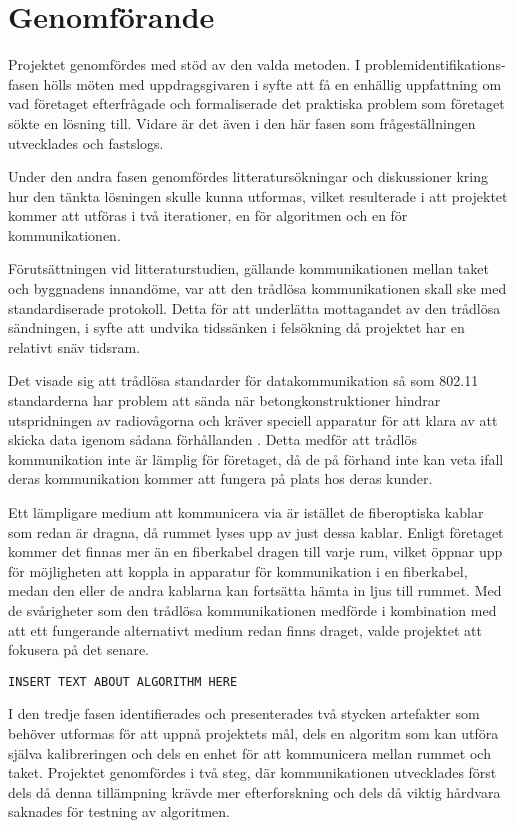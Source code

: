 \section{Genomförande} %
\label{sec:genomf_rande}

    Projektet genomfördes med stöd av den valda metoden. I problemidentifikations-fasen hölls möten med uppdragsgivaren i syfte att få en enhällig uppfattning om vad företaget efterfrågade och formaliserade det praktiska problem som företaget sökte en lösning till. Vidare är det även i den här fasen som frågeställningen utvecklades och fastslogs. \bigskip

    Under den andra fasen genomfördes litteratursökningar och diskussioner kring hur den tänkta lösningen skulle kunna utformas, vilket resulterade i att projektet kommer att utföras i två iterationer, en för algoritmen och en för kommunikationen. \bigskip

    Förutsättningen vid litteraturstudien, gällande kommunikationen mellan taket och byggnadens innandöme, var att den trådlösa kommunikationen skall ske med standardiserade protokoll. Detta för att underlätta mottagandet av den trådlösa sändningen, i syfte att undvika tidssänken i felsökning då projektet har en relativt snäv tidsram.\bigskip

    Det visade sig att trådlösa standarder för datakommunikation så som 802.11 standarderna har problem att sända när betongkonstruktioner hindrar utspridningen av radiovågorna och kräver speciell apparatur för att klara av att skicka data igenom sådana förhållanden \cite{11n}. Detta medför att trådlös kommunikation inte är lämplig för företaget, då de på förhand inte kan veta ifall deras kommunikation kommer att fungera på plats hos deras kunder. \bigskip

    Ett lämpligare medium att kommunicera via är istället de fiberoptiska kablar som redan är dragna, då rummet lyses upp av just dessa kablar. Enligt företaget kommer det finnas mer än en fiberkabel dragen till varje rum, vilket öppnar upp för möjligheten att koppla in apparatur för kommunikation i en fiberkabel, medan den eller de andra kablarna kan fortsätta hämta in ljus till rummet. Med de svårigheter som den trådlösa kommunikationen medförde i kombination med att ett fungerande alternativt medium redan finns draget, valde projektet att fokusera på det senare. \bigskip

    \texttt{INSERT TEXT ABOUT ALGORITHM HERE} \bigskip
 
    I den tredje fasen identifierades och presenterades två stycken artefakter som behöver utformas för att uppnå projektets mål, dels en algoritm som kan utföra själva kalibreringen och dels en enhet för att kommunicera mellan rummet och taket. Projektet genomfördes i två steg, där kommunikationen 
    utvecklades först dels då denna tillämpning krävde mer efterforskning och dels då viktig hårdvara saknades för testning av algoritmen. \bigskip

